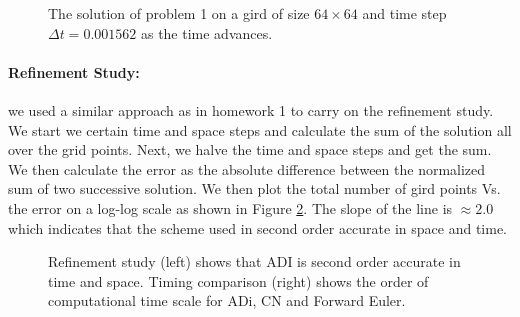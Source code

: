 \begin{figure}[tbh]
  \caption{The solution of problem 1 on a gird of size $64\times 64$ and time step $\Delta t = 0.001562$ as the time advances. }
   \label{fig:sol}
\end{figure} 

\paragraph{Refinement Study:} we used a similar approach as in homework 1 to carry on the refinement study. We start we certain time and space steps and calculate the sum of the solution all over the grid points. Next, we halve the time and space steps and get the sum. We then calculate the error as the absolute difference between the normalized sum of two successive solution. We then plot the total number of gird points Vs. the error on a log-log scale as shown in Figure \ref{fig:ref}. The slope of the line is $\approx 2.0$ which indicates that the scheme used in second order accurate in space and time. 
	
\begin{figure}[tbh]
 \centering  
  \caption{Refinement study (left) shows that ADI is second order accurate in time and space. Timing comparison (right) shows the order of computational time scale for ADi, CN and Forward Euler.}
   \label{fig:ref}
\end{figure} 

